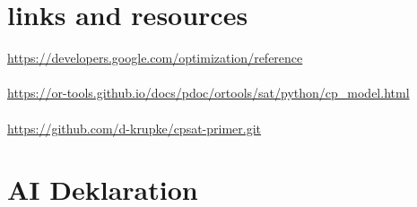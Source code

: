 \documentclass[12pt]{article}
\begin{document}
\section{links and resources}
\url{https://developers.google.com/optimization/reference}
\\
\\
\url{https://or-tools.github.io/docs/pdoc/ortools/sat/python/cp_model.html}
\\
\\
\url{https://github.com/d-krupke/cpsat-primer.git}

\section{AI Deklaration}



\end{document}
